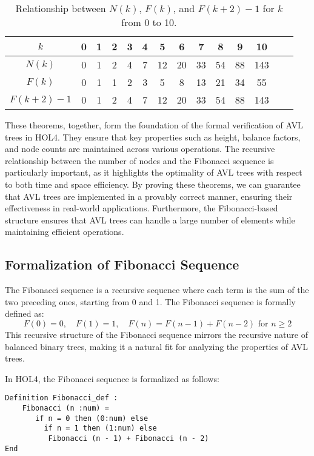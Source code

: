 \documentclass[12pt]{article}
\begin{document}
\begin{itemize}
\begin{table}
    \centering
    \begin{tabular}{cccccccccccccc}
        \toprule
        \textbf{$k$}          & 0   & 1   & 2   & 3   & 4   & 5    & 6    & 7    & 8    & 9    & 10     \\ \midrule
        \textbf{$N(k)$}       & 0   & 1   & 2   & 4   & 7   & 12   & 20   & 33   & 54   & 88   & 143   \\ \midrule
        \textbf{$F(k)$}       & 0   & 1   & 1   & 2   & 3   & 5    & 8    & 13   & 21   & 34   & 55    \\ \midrule
        \textbf{$F(k+2) - 1$} & 0   & 1   & 2   & 4   & 7   & 12   & 20   & 33   & 54   & 88   & 143  \\ 
        \bottomrule
    \end{tabular}
    \caption{Relationship between $N(k)$, $F(k)$, and $F(k+2) - 1$ for $k$ from 0 to 10.}
\end{table}
  
These theorems, together, form the foundation of the formal verification of AVL trees in HOL4. They ensure that key properties such as height, balance factors, and node counts are maintained across various operations. The recursive relationship between the number of nodes and the Fibonacci sequence is particularly important, as it highlights the optimality of AVL trees with respect to both time and space efficiency. By proving these theorems, we can guarantee that AVL trees are implemented in a provably correct manner, ensuring their effectiveness in real-world applications. Furthermore, the Fibonacci-based structure ensures that AVL trees can handle a large number of elements while maintaining efficient operations.

\subsection{Formalization of Fibonacci Sequence}

The Fibonacci sequence is a recursive sequence where each term is the sum of the two preceding ones, starting from 0 and 1. The Fibonacci sequence is formally defined as:
\[
F(0) = 0, \quad F(1) = 1, \quad F(n) = F(n-1) + F(n-2) \text{ for } n \geq 2
\]
This recursive structure of the Fibonacci sequence mirrors the recursive nature of balanced binary trees, making it a natural fit for analyzing the properties of AVL trees.

In HOL4, the Fibonacci sequence is formalized as follows:
\begin{verbatim}
Definition Fibonacci_def :
    Fibonacci (n :num) =
       if n = 0 then (0:num) else
         if n = 1 then (1:num) else
          Fibonacci (n - 1) + Fibonacci (n - 2)
End
\end{verbatim}


\end{itemize}
\end{document}
